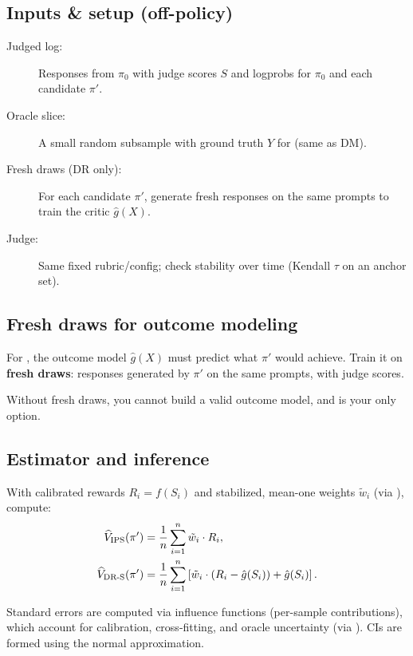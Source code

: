 \subsection{Inputs \& setup (off-policy)}

\begin{description}
\item[Judged log:] Responses from $\pi_0$ with judge scores $S$ and logprobs for $\pi_0$ and each candidate $\pi'$.
\item[Oracle slice:] A small random subsample with ground truth $Y$ for \autocal{} (same as DM).
\item[Fresh draws (DR only):] For each candidate $\pi'$, generate fresh responses on the same prompts to train the critic $\hat{g}(X)$.
\item[Judge:] Same fixed rubric/config; check stability over time (Kendall $\tau$ on an anchor set).
\end{description}

\subsection{Fresh draws for outcome modeling}

For \dr, the outcome model $\hat{g}(X)$ must predict what $\pi'$ would achieve. Train it on \textbf{fresh draws}: responses generated by $\pi'$ on the same prompts, with judge scores.

Without fresh draws, you cannot build a valid outcome model, and \ips{} is your only option.

\subsection{Estimator and inference}

With calibrated rewards $R_i = f(S_i)$ and stabilized, mean-one weights $\tilde{w}_i$ (via \simcal), compute:
\begin{align}
\widehat{V}_{\text{IPS}}(\pi') &= \frac{1}{n} \sum_{i=1}^n \tilde{w}_i \cdot R_i, \\
\widehat{V}_{\text{DR-S}}(\pi') &= \frac{1}{n} \sum_{i=1}^n \left[ \tilde{w}_i \cdot (R_i - \hat{g}(S_i)) + \hat{g}(S_i) \right].
\end{align}

Standard errors are computed via influence functions (per-sample contributions), which account for calibration, cross-fitting, and oracle uncertainty (via \oua). CIs are formed using the normal approximation.

